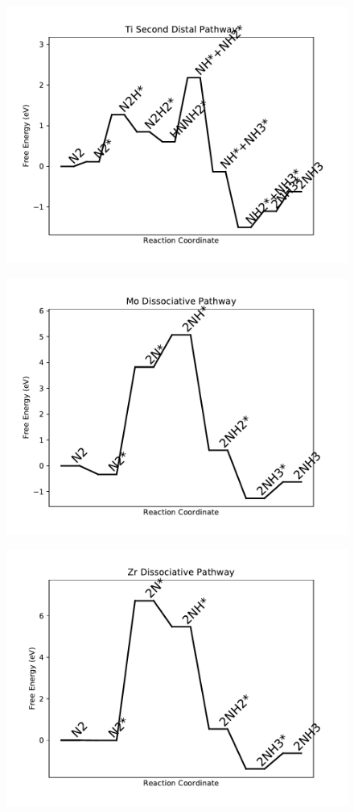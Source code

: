 \begin{figure}
\includegraphics[width=0.8\linewidth]{data/plots/Ti_distal_2.pdf}
\label{fig:Ti_distal_2}
\end{figure}

\begin{figure}
\includegraphics[width=0.8\linewidth]{data/plots/Mo_dissociative.pdf}
\label{fig:Mo_dissociative}
\end{figure}

\begin{figure}
\includegraphics[width=0.8\linewidth]{data/plots/Zr_dissociative.pdf}
\label{fig:Zr_dissociative}
\end{figure}


